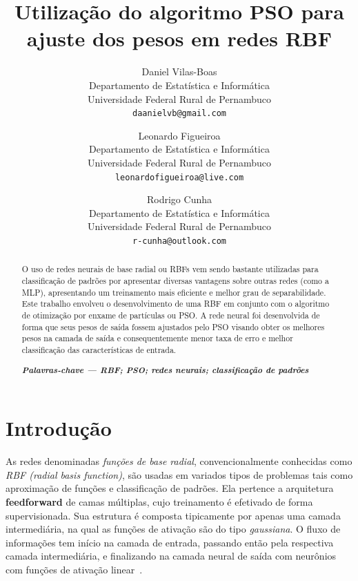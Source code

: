 \documentclass[10pt,twocolumn,letterpaper]{article}
\begin{document}
\title{\Huge Utilização do algoritmo PSO para ajuste dos pesos em redes RBF}

\author{Daniel Vilas-Boas\\
\footnotesize Departamento de Estatística e Informática\\
\footnotesize Universidade Federal Rural de Pernambuco\\
{\tt\small daanielvb@gmail.com}
\and
Leonardo Figueiroa\\
\footnotesize Departamento de Estatística e Informática\\
\footnotesize Universidade Federal Rural de Pernambuco\\
{\tt\small leonardofigueiroa@live.com}
\and
Rodrigo Cunha\\
\footnotesize Departamento de Estatística e Informática\\
\footnotesize Universidade Federal Rural de Pernambuco\\
{\tt\small r-cunha@outlook.com}
}

\maketitle

\begin{abstract}
O uso de redes neurais de base radial ou RBFs vem sendo bastante utilizadas para classificação de padrões por apresentar diversas vantagens sobre outras redes (como a MLP), apresentando um treinamento mais eficiente e melhor grau de separabilidade. Este trabalho envolveu o desenvolvimento de uma RBF em conjunto com o algoritmo de otimização por enxame de partículas ou PSO. A rede neural foi desenvolvida de forma que seus pesos de saída fossem ajustados pelo PSO visando obter os melhores pesos na camada de saída e consequentemente menor taxa de erro e melhor classificação das características de entrada.\\
\begin{center}
\textbf{\textit{Palavras-chave --- RBF; PSO; redes neurais; classificação de padrões}}\\
\end{center}
\end{abstract}


\section{Introdução}
As redes denominadas \textit{funções de base radial}, convencionalmente conhecidas como \textit{RBF (radial basis function)}, são usadas em variados tipos de problemas tais como aproximação de funções e classificação de padrões. Ela pertence a arquitetura \textbf{feedforward} de camas múltiplas, cujo treinamento é efetivado de forma supervisionada. Sua estrutura é composta tipicamente por apenas uma camada intermediária, na qual as funções de ativação são do tipo \textit{gaussiana}. O fluxo de informações tem início na camada de entrada, passando então pela respectiva camada intermediária, e finalizando na camada neural de saída com neurônios com funções de ativação linear~\cite{livroAula}.\\ 
\end{document}
